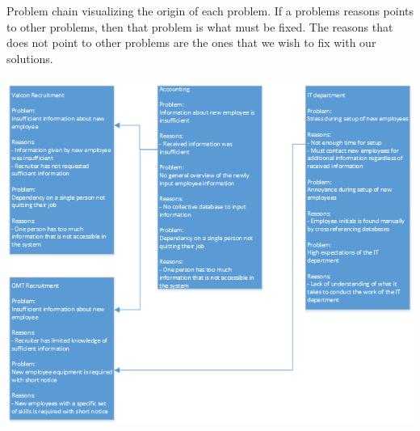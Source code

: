 \label{app:ProblemChain}

Problem chain visualizing the origin of each problem.
If a problems reasons points to other problems, then that problem is what must be fixed.
The reasons that does not point to other problems are the ones that we wish to fix with our solutions.
\\\\

\includegraphics[scale=0.75]{appendix/ProblemChain.png}